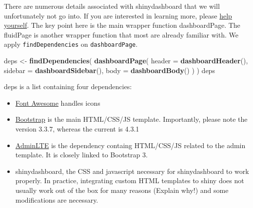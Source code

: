 \documentclass[
]{book}
\newenvironment{Shaded}{\begin{snugshade}}{\end{snugshade}}
\newcommand{\DataTypeTok}[1]{\textcolor[rgb]{0.13,0.29,0.53}{#1}}
\newcommand{\KeywordTok}[1]{\textcolor[rgb]{0.13,0.29,0.53}{\textbf{#1}}}
\newcommand{\NormalTok}[1]{#1}
\newcommand{\StringTok}[1]{\textcolor[rgb]{0.31,0.60,0.02}{#1}}
\providecommand{\tightlist}{%
  \setlength{\itemsep}{0pt}\setlength{\parskip}{0pt}}
\begin{document}
There are numerous details associated with shinydashboard that we will unfortunately not go into. If you are interested in learning more, please \href{https://rstudio.github.io/shinydashboard/}{help yourself}. The key point here is the main wrapper function dashboardPage. The fluidPage is another wrapper function that most are already familiar with. We apply \texttt{findDependencies} on \texttt{dashboardPage}.

\begin{Shaded}
\begin{Highlighting}[]
\NormalTok{deps <-}\StringTok{ }\KeywordTok{findDependencies}\NormalTok{(}
  \KeywordTok{dashboardPage}\NormalTok{(}
    \DataTypeTok{header =} \KeywordTok{dashboardHeader}\NormalTok{(), }
    \DataTypeTok{sidebar =} \KeywordTok{dashboardSidebar}\NormalTok{(), }
    \DataTypeTok{body =} \KeywordTok{dashboardBody}\NormalTok{()}
\NormalTok{  )}
\NormalTok{)}
\NormalTok{deps}
\end{Highlighting}
\end{Shaded}

deps is a list containing four dependencies:

\begin{itemize}
\tightlist
\item
  \href{https://fontawesome.com}{Font Awesome} handles icons
\item
  \href{https://getbootstrap.com/docs/3.3/}{Bootstrap} is the main HTML/CSS/JS template. Importantly,
  please note the version 3.3.7, whereas the current is 4.3.1
\item
  \href{https://adminlte.io}{AdminLTE} is the dependency containg HTML/CSS/JS related to the admin template.
  It is closely linked to Bootstrap 3.
\item
  shinydashboard, the CSS and javascript necessary for shinydashboard to work properly. In practice,
  integrating custom HTML templates to shiny does not usually work out of the box for many reasons (Explain why!) and some modifications are necessary.
\end{itemize}
\end{document}
